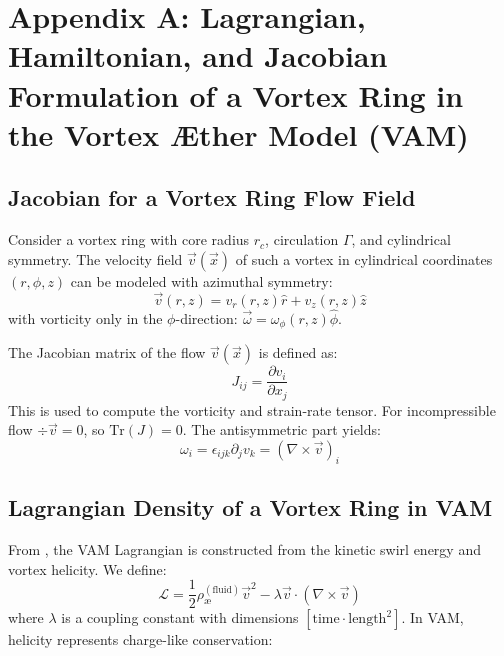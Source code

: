\section*{Appendix A: Lagrangian, Hamiltonian, and Jacobian Formulation of a Vortex Ring in the Vortex \AE ther Model (VAM)}\label{appendix:lagrangian}


\subsection{Jacobian for a Vortex Ring Flow Field}
    Consider a vortex ring with core radius $r_c$, circulation $\Gamma$, and cylindrical symmetry. The velocity field $\vec{v}(\vec{x})$ of such a vortex in cylindrical coordinates $(r, \phi, z)$ can be modeled with azimuthal symmetry:
    \begin{equation}
        \vec{v}(r, z) = v_r(r, z)\hat{r} + v_z(r, z)\hat{z}
    \end{equation}
    with vorticity only in the $\phi$-direction: $\vec{\omega} = \omega_\phi(r, z)\hat{\phi}$.

    The Jacobian matrix of the flow $\vec{v}(\vec{x})$ is defined as:
    \begin{equation}
        J_{ij} = \frac{\partial v_i}{\partial x_j}
    \end{equation}
    This is used to compute the vorticity and strain-rate tensor. For incompressible flow $\div \vec{v} = 0$, so $\mathrm{Tr}(J) = 0$. The antisymmetric part yields:
    \begin{equation}
        \omega_i = \epsilon_{ijk} \partial_j v_k = (\nabla \times \vec{v})_i
    \end{equation}

    \subsection{Lagrangian Density of a Vortex Ring in VAM}
    From \cite{VAM-1,VAM-2,VAM-0}, the VAM Lagrangian is constructed from the kinetic swirl energy and vortex helicity. We define:
    \begin{equation}
        \mathcal{L} = \frac{1}{2} \rho_\text{\ae}^{(\text{fluid})} \vec{v}^{2} - \lambda \vec{v} \cdot (\nabla \times \vec{v})
    \end{equation}
    where $\lambda$ is a coupling constant with dimensions $[\text{time} \cdot \text{length}^2]$. In VAM, helicity represents charge-like conservation:\cite{VAM-5,VAM-6}

